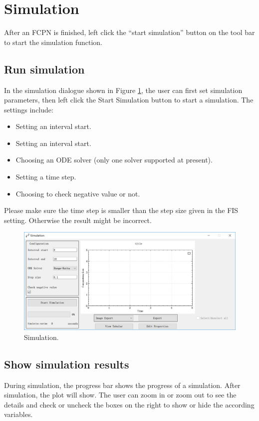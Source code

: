 \documentclass[journal,a4paper,onecolumn]{article}
\begin{document}
\clearpage

\section{Simulation}
After an FCPN is finished, left click the ``start simulation'' button on the tool bar to start the simulation function.

\subsection{Run simulation}
In the simulation dialogue shown in Figure \ref{fig:Simulation}, the user can first set simulation parameters, then left click the Start Simulation button to start a simulation. The settings include:
\begin{itemize}
	\item Setting an interval start.
	\item Setting an interval start.
	\item Choosing an ODE solver (only one solver supported at present).
	\item Setting a time step.
	\item Choosing to check negative value or not.
\end{itemize}

Please make sure the time step is smaller than the step size given in the FIS setting. Otherwise the result might be incorrect.

\begin{figure}[!hbt]
	\begin{center}
		\includegraphics[width=\columnwidth]{fig13}
		\caption{Simulation.}
		\label{fig:Simulation}
	\end{center}
\end{figure}

\subsection{Show simulation results}
During simulation, the progress bar shows the progress of a simulation. After simulation, the plot will show. The user can zoom in or zoom out to see the details and check or uncheck the boxes on the right to show or hide the according variables.
\end{document}

